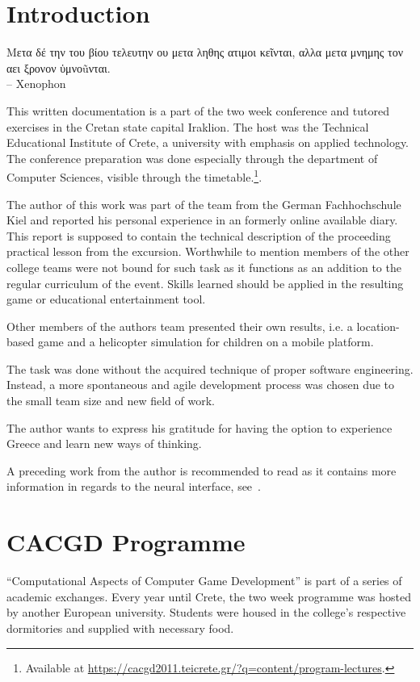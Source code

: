 \documentclass[bibtotocnumbered, headsepline,normalheadings,12pt]{report}
\newcommand{\gdir}%
   {\foreignlanguage{polutonikogreek}}
\begin{document}
\chapter{Introduction}
\label{chap:intro}
\gdir{Μετα δέ την του βίου τελευτην ου  μετα ληθης ατιμοι κεῖνται, αλλα μετα μνημης τον αει ξρονον ὑμνοũνται.}\\
-- Xenophon
\vspace{15mm}

This written documentation is a part of the two week conference and tutored exercises in the Cretan state capital Iraklion. The host was the
Technical Educational Institute of Crete, a university with emphasis on applied technology. The conference preparation was done especially through the 
department of Computer Sciences, visible through the timetable.\footnote{Available at \url{https://cacgd2011.teicrete.gr/?q=content/program-lectures}.}.

The author of this work was part of the team from the German Fachhochschule Kiel and reported his personal experience in an formerly online available
diary. This report is supposed to contain the technical description of the proceeding practical lesson from the excursion. Worthwhile to mention 
members of the other college teams were not bound for such task as it functions as an addition to the regular curriculum of the event.
Skills learned should be applied in the resulting game or educational entertainment tool.

Other members of the authors team presented their own results, i.e. a location-based game and a helicopter simulation for children on a mobile platform.

The task was done without the acquired technique of proper software engineering. Instead, a more spontaneous and agile development process was
chosen due to the small team size and new field of work.

The author wants to express his gratitude for having the option to experience Greece and learn new ways of thinking. 

A preceding work from the author is recommended to read as it contains more information in regards to the neural interface, see~\cite{pm}.


\chapter{CACGD Programme}
\label{chap:cacgd}

``Computational Aspects of Computer Game Development'' is part of a series of academic exchanges. Every year until Crete, the 
two week programme was hosted by another European university. Students were housed in the college's respective dormitories and 
supplied with necessary food.
\end{document}
